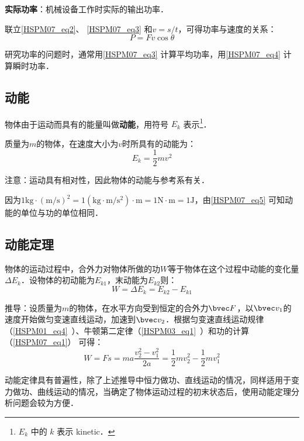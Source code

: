 \textbf{实际功率}：机械设备工作时实际的输出功率．

联立\autoref{HSPM07_eq2}、 \autoref{HSPM07_eq3} 和$v=s/t$，可得功率与速度的关系：
\begin{equation}\label{HSPM07_eq4}
P=Fv\cos \theta
\end{equation}

研究功率的问题时，通常用\autoref{HSPM07_eq3} 计算平均功率，用\autoref{HSPM07_eq4} 计算瞬时功率．

\subsection{动能}

物体由于运动而具有的能量叫做\textbf{动能}，用符号 $E_k$ 表示\footnote{$E_k$ 中的 $k$ 表示 kinetic．}．

质量为$m$的物体，在速度大小为$v$时所具有的动能为：
\begin{equation}\label{HSPM07_eq5}
E_k=\frac12mv^2
\end{equation}

注意：运动具有相对性，因此物体的动能与参考系有关．

因为$\mathrm{1kg\cdot (m/s)^2=1(kg\cdot m/s^2)\cdot m=1N\cdot m=1J}$，由\autoref{HSPM07_eq5} 可知动能的单位与功的单位相同．

\subsection{动能定理}

物体的运动过程中，合外力对物体所做的功$W$等于物体在这个过程中动能的变化量$\Delta E_k$．设物体的初动能为$E_{k1}$，末动能为$E_{k2}$则：
\begin{equation}\label{HSPM07_eq6}
W=\Delta E_k =E_{k2}-E_{k1}
\end{equation}

推导：设质量为$m$的物体，在水平方向受到恒定的合外力$\bvec F$，以$\bvec v_1$的速度开始做匀变速直线运动，加速到$\bvec v_2$．根据匀变速直线运动规律（\autoref{HSPM01_eq4}~）、牛顿第二定律（\autoref{HSPM03_eq1}~）和功的计算（\autoref{HSPM07_eq1}） 可得：
\begin{equation}
W=Fs=ma\frac{v_2^2-v_1^2}{2a}=\frac12mv_2^2-\frac12mv_1^2
\end{equation}

动能定律具有普遍性，除了上述推导中恒力做功、直线运动的情况，同样适用于变力做功、曲线运动的情况，当确定了物体运动过程的初末状态后，使用动能定理分析问题会较为方便．

